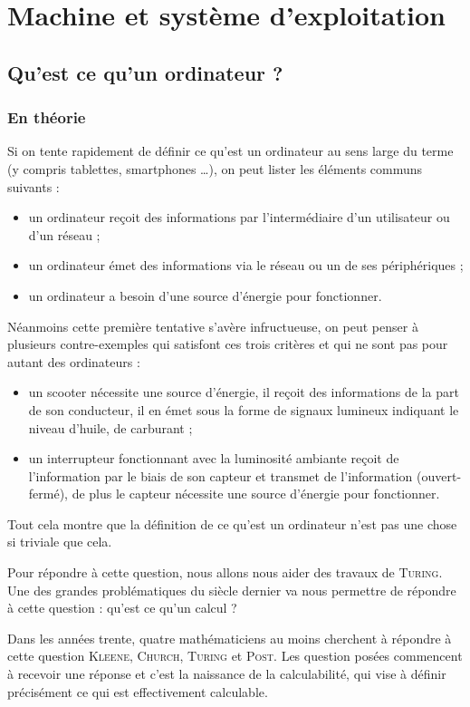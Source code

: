 \chapter{Machine et système d'exploitation}
\section{Qu'est ce qu'un ordinateur ?}
\subsection{En théorie}
Si on tente rapidement de définir ce qu'est un ordinateur au sens large du terme (y compris tablettes, smartphones \dots), on peut lister les éléments communs suivants :
\begin{itemize}
\item un ordinateur reçoit des informations par l'intermédiaire d'un utilisateur ou d'un réseau ;
\item un ordinateur émet des informations via le réseau ou un de ses périphériques ;
\item un ordinateur a besoin d'une source d'énergie pour fonctionner.
\end{itemize}
Néanmoins cette première tentative s'avère infructueuse, on peut penser à plusieurs contre-exemples qui satisfont ces trois critères et qui ne sont pas pour autant des ordinateurs :
\begin{itemize}
\item un scooter nécessite une source d'énergie, il reçoit des informations de la part de son conducteur, il en émet sous la forme de signaux lumineux indiquant le niveau d'huile, de carburant ;
\item un interrupteur fonctionnant avec la luminosité ambiante reçoit de l'information par le biais de son capteur et transmet de l'information (ouvert-fermé), de plus le capteur nécessite une source d'énergie pour fonctionner.
\end{itemize}
Tout cela montre que la définition de ce qu'est un ordinateur n'est pas une chose si triviale que cela.\par
Pour répondre à cette question, nous allons nous aider des travaux de \textsc{Turing}. Une des grandes problématiques du siècle dernier va nous permettre de répondre à cette question : qu'est ce qu'un calcul ?\par
Dans les années trente, quatre mathématiciens au moins cherchent à répondre à cette question \textsc{Kleene}, \textsc{Church}, \textsc{Turing} et \textsc{Post}. Les question posées commencent à recevoir une réponse et c'est la naissance de la calculabilité, qui vise à définir précisément ce qui est effectivement calculable.\par 
